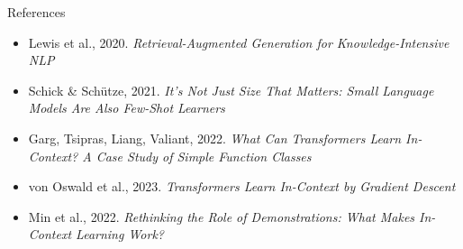 \begin{frame}[t]{References}
\begin{itemize}
        \item[\textcolor{red}{$\triangleright$}] Lewis et al., 2020. \textit{Retrieval-Augmented Generation for Knowledge-Intensive NLP}
        \item[\textcolor{red}{$\triangleright$}] Schick \& Schütze, 2021. \textit{It's Not Just Size That Matters: Small Language Models Are Also Few-Shot Learners}
        \item[\textcolor{red}{$\triangleright$}] Garg, Tsipras, Liang, Valiant, 2022. \textit{What Can Transformers Learn In-Context? A Case Study of Simple Function Classes}
        \item[\textcolor{red}{$\triangleright$}] von Oswald et al., 2023. \textit{Transformers Learn In-Context by Gradient Descent}
        \item[\textcolor{red}{$\triangleright$}] Min et al., 2022. \textit{Rethinking the Role of Demonstrations: What Makes In-Context Learning Work?}
    \end{itemize}
\end{frame}

